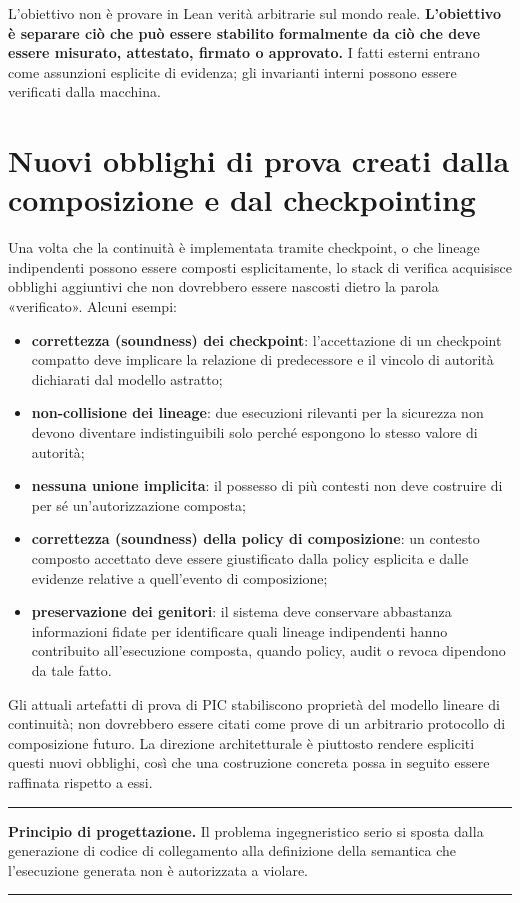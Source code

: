 \documentclass[10pt,oneside,openany]{book}
\newcommand{\principle}[1]{%
  \vspace{4pt}
  \noindent\begin{minipage}{\linewidth}
  \hrule\vspace{5pt}
  \small\sffamily\raggedright\textbf{Principio di progettazione.} #1
  \vspace{5pt}\hrule
  \end{minipage}\vspace{4pt}
}
\begin{document}
L'obiettivo non è provare in Lean verità arbitrarie sul mondo reale. \textbf{L'obiettivo è separare ciò che può essere stabilito formalmente da ciò che deve essere misurato, attestato, firmato o approvato.} I fatti esterni entrano come assunzioni esplicite di evidenza; gli invarianti interni possono essere verificati dalla macchina.

\section{Nuovi obblighi di prova creati dalla composizione e dal checkpointing}
Una volta che la continuità è implementata tramite checkpoint, o che lineage indipendenti possono essere composti esplicitamente, lo stack di verifica acquisisce obblighi aggiuntivi che non dovrebbero essere nascosti dietro la parola «verificato». Alcuni esempi:
\begin{itemize}
\item \textbf{correttezza (soundness) dei checkpoint}: l'accettazione di un checkpoint compatto deve implicare la relazione di predecessore e il vincolo di autorità dichiarati dal modello astratto;
\item \textbf{non-collisione dei lineage}: due esecuzioni rilevanti per la sicurezza non devono diventare indistinguibili solo perché espongono lo stesso valore di autorità;
\item \textbf{nessuna unione implicita}: il possesso di più contesti non deve costruire di per sé un'autorizzazione composta;
\item \textbf{correttezza (soundness) della policy di composizione}: un contesto composto accettato deve essere giustificato dalla policy esplicita e dalle evidenze relative a quell'evento di composizione;
\item \textbf{preservazione dei genitori}: il sistema deve conservare abbastanza informazioni fidate per identificare quali lineage indipendenti hanno contribuito all'esecuzione composta, quando policy, audit o revoca dipendono da tale fatto.
\end{itemize}
Gli attuali artefatti di prova di PIC stabiliscono proprietà del modello lineare di continuità; non dovrebbero essere citati come prove di un arbitrario protocollo di composizione futuro. La direzione architetturale è piuttosto rendere espliciti questi nuovi obblighi, così che una costruzione concreta possa in seguito essere raffinata rispetto a essi.

\principle{Il problema ingegneristico serio si sposta dalla generazione di codice di collegamento alla definizione della semantica che l'esecuzione generata non è autorizzata a violare.}
\end{document}
